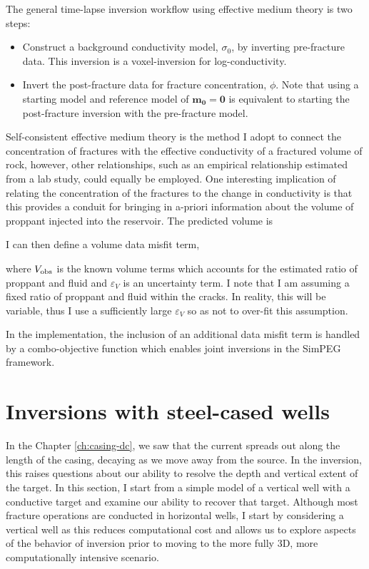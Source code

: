 The general time-lapse inversion workflow using effective medium theory is two steps:
\begin{itemize}
    \item{Construct a background conductivity model, $\sigma_0$, by inverting pre-fracture data. This inversion is a voxel-inversion for log-conductivity.}
    \item{Invert the post-fracture data for fracture concentration, $\phi$. Note that using a starting model and reference model of $\mathbf{m_0} = \mathbf{0}$ is equivalent to starting the post-fracture inversion with the pre-fracture model.}
\end{itemize}

Self-consistent effective medium theory is the method I adopt to connect the concentration of fractures with the effective conductivity of a fractured volume of rock, however, other relationships, such as an empirical relationship estimated from a lab study, could equally be employed. One interesting implication of relating the concentration of the fractures to the change in conductivity is that this provides a conduit for bringing in a-priori information about the volume of proppant injected into the reservoir. The predicted volume is

I can then define a volume data misfit term,

where $V_{\rm obs}$ is the known volume terms which accounts for the estimated ratio of proppant and fluid and $\varepsilon_V$ is an uncertainty term. I note that I am assuming a fixed ratio of proppant and fluid within the cracks. In reality, this will be variable, thus I use a sufficiently large $\varepsilon_V$ so as not to over-fit this assumption.

In the implementation, the inclusion of an additional data misfit term is handled by a combo-objective function which enables joint inversions in the SimPEG framework.

\section{Inversions with steel-cased wells}

In the Chapter \ref{ch:casing-dc}, we saw that the current spreads out along the length of the casing, decaying as we move away from the source. In the inversion, this raises questions about our ability to resolve the depth and vertical extent of the target. In this section, I start from a simple model of a vertical well with a conductive target and examine our ability to recover that target. Although most fracture operations are conducted in horizontal wells, I start by considering a vertical well as this reduces computational cost and allows us to explore aspects of the behavior of inversion prior to moving to the more fully 3D, more computationally intensive scenario.

